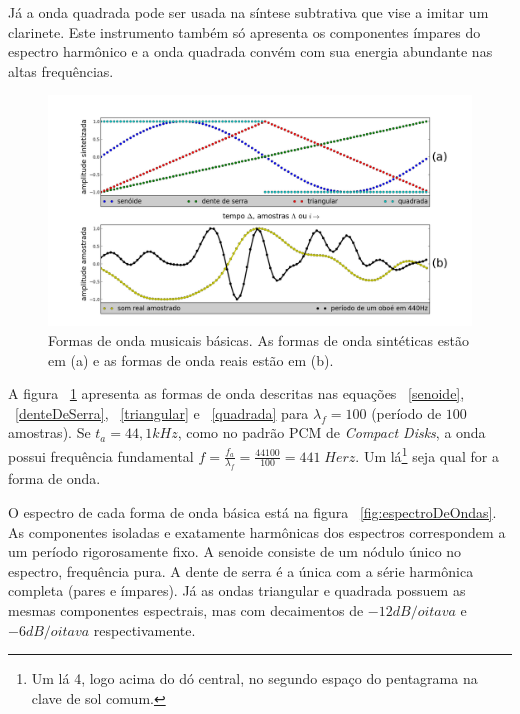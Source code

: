 Já a onda quadrada pode ser usada na síntese
subtrativa que vise a imitar um clarinete. Este instrumento também só apresenta os
componentes ímpares do espectro harmônico e a onda quadrada convém com sua energia abundante nas altas frequências.



\begin{figure}[h!]
    \centering
        \includegraphics[width=\textwidth]{figuras/formasDeOnda6}
    \caption{Formas de onda musicais básicas. As formas de onda sintéticas estão em (a) e as formas de onda reais estão em (b).}
        \label{fig:formasDeOnda}
\end{figure}



A figura ~\ref{fig:formasDeOnda} apresenta
as formas de onda descritas nas equações ~\ref{senoide}, ~\ref{denteDeSerra}, ~\ref{triangular} e ~\ref{quadrada} para $\lambda_f=100$ (período
de $100$ amostras).
Se $t_a=44,1 kHz$, como no padrão PCM de \emph{Compact Disks}, a onda possui frequência fundamental $f=\frac{f_a}{\lambda_f}=\frac{44100}{100} = 441 \; Herz $. Um lá\footnote{Um lá 4, logo acima do dó central, no segundo espaço do pentagrama na clave de sol comum.} seja qual for a forma de onda.

O espectro de cada forma de onda básica está na figura ~\ref{fig:espectroDeOndas}. As componentes isoladas e exatamente harmônicas dos espectros correspondem a um período rigorosamente fixo. A senoide consiste de um nódulo único no espectro, frequência pura. A dente de serra é a única com a série harmônica completa (pares e ímpares). Já as ondas triangular e quadrada possuem as mesmas componentes espectrais, mas com decaimentos de $-12dB/oitava$ e $-6dB/oitava$ respectivamente.

